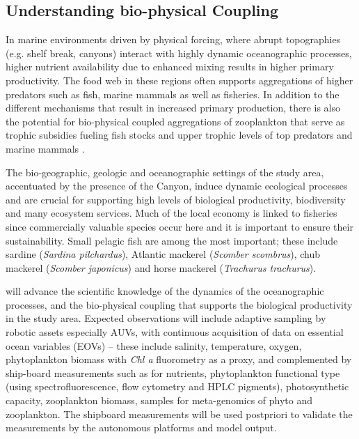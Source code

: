 \subsection{Understanding bio-physical Coupling}


In marine environments driven by physical forcing, where abrupt
topographies (e.g. shelf break, canyons) interact with highly dynamic
oceanographic processes, higher nutrient availability due to enhanced
mixing results in higher primary productivity.  The food web in these
regions often supports aggregations of higher predators such as fish,
marine mammals as well as fisheries. In addition to the different
mechanisms that result in increased primary production, there is also
the potential for bio-physical coupled aggregations of zooplankton
that serve as trophic subsidies fueling fish stocks and upper trophic
levels of top predators and marine mammals \cite{genin04}.

The bio-geographic, geologic and oceanographic settings of the study
area, accentuated by the presence of the \naz Canyon, induce dynamic
ecological processes and are crucial for supporting high levels of
biological productivity, biodiversity and many ecosystem
services. Much of the local economy is linked to fisheries since
commercially valuable species occur here and it is important to ensure
their sustainability. Small pelagic fish are among the most important;
these include sardine (\emph{Sardina pilchardus}), Atlantic mackerel
(\emph{Scomber scombrus}), chub mackerel (\emph{Scomber japonicus})
and horse mackerel (\emph{Trachurus trachurus}).  

\proj will advance the scientific knowledge of the dynamics of the
oceanographic processes, and the bio-physical coupling that supports
the biological productivity in the study area. Expected observations
will include adaptive sampling by robotic assets especially AUVs, with
continuous acquisition of data on essential ocean variables (EOVs) --
these include salinity, temperature, oxygen, phytoplankton biomass
with \emph{Chl a} fluorometry as a proxy, and complemented by
ship-board measurements such as for nutrients, phytoplankton
functional type (using spectrofluorescence, flow cytometry and HPLC
pigments), photosynthetic capacity, zooplankton biomass, samples for
meta-genomics of phyto and zooplankton.  The shipboard measurements
will be used postpriori to validate the measurements by the autonomous
platforms and model output.

